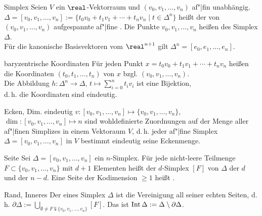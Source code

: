 \begin{Def}{Simplex}
    Seien $V$ ein $\real$-Vektorraum und $(v_0, v_1, \dotsc, v_n)$
    af"|fin unabhängig. \\
    $\Delta = [v_0, v_1, \dotsc, v_n] :=
    \{t_0 v_0 + t_1 v_1 + \dotsb + t_n v_n \;|\; t \in \Delta^n\}$ heißt
    der von $(v_0, v_1, \dotsc, v_n)$ aufgespannte af"|fine
    .
    Die Punkte $v_0, v_1, \dotsc, v_n$ heißen  des Simplex
    $\Delta$. \\
    Für die kanonische Basisvektoren vom $\real^{n+1}$ gilt
    $\Delta^n = [e_0, e_1, \dotsc, e_n]$.
\end{Def}

\begin{Def}{baryzentrische Koordinaten}
    Für jeden Punkt $x = t_0 v_0 + t_1 v_1 + \dotsb + t_n v_n$
    heißen die Koordinaten
    $(t_0, t_1, \dotsc, t_n)$ 
    von $x$ bzgl. $(v_0, v_1, \dotsc, v_n)$. \\
    Die Abbildung
    $h\colon \Delta^n \rightarrow \Delta$, $t \mapsto \sum_{i=0}^n t_i v_i$
    ist eine Bijektion, \\
    d.\,h. die Koordinaten sind eindeutig.
\end{Def}

\begin{Satz}{Ecken, Dim. eindeutig}
    $v\colon [v_0, v_1, \dotsc, v_n] \mapsto \{v_0, v_1, \dotsc, v_n\}$,
    $\dim\colon [v_0, v_1, \dotsc, v_n] \mapsto n$ sind wohldefinierte
    Zuordnungen auf der Menge aller af"|finen Simplizes in
    einem Vektoraum $V$, d.\,h.
    jeder af"|fine Simplex $\Delta = [v_0, v_1, \dotsc, v_n]$ in $V$
    bestimmt eindeutig seine Eckenmenge.
\end{Satz}

\linie

\begin{Def}{Seite}
    Sei $\Delta = [v_0, v_1, \dotsc, v_n]$ ein $n$-Simplex.
    Für jede nicht-leere Teilmenge \\
    $F \subset \{v_0, v_1, \dotsc, v_n\}$ mit
    $d + 1$ Elementen heißt der $d$-Simplex
    $[F]$  von $\Delta$ der
     $d$ und der  $n - d$.
    Eine Seite der Kodimension $\ge 1$ heißt .
\end{Def}

\begin{Def}{Rand, Inneres}
    Der  eines Simplex $\Delta$ ist
    die Vereinigung all seiner echten Seiten, d.\,h. $\partial \Delta :=
    \bigcup_{\emptyset \not= F \subsetneqq \{v_0, v_1, \dotsc, v_n\}} [F]$.
    Das  ist $\operatorname{Int} \Delta := \Delta \setminus \partial \Delta$.
\end{Def}

